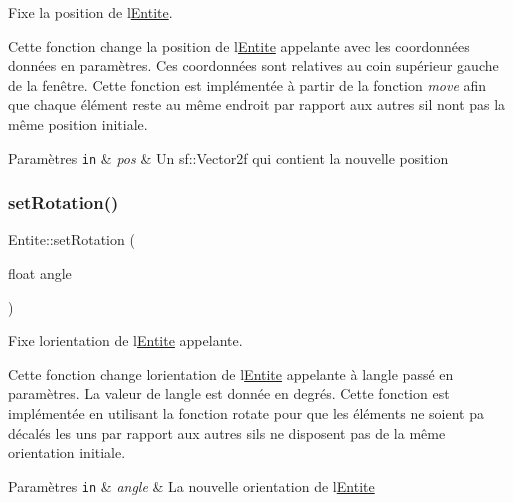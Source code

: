 Fixe la position de l\textquotesingle{}\hyperlink{class_entite}{Entite}. 

Cette fonction change la position de l\textquotesingle{}\hyperlink{class_entite}{Entite} appelante avec les coordonnées données en paramètres. Ces coordonnées sont relatives au coin supérieur gauche de la fenêtre. Cette fonction est implémentée à partir de la fonction {\itshape move} afin que chaque élément reste au même endroit par rapport aux autres s\textquotesingle{}il n\textquotesingle{}ont pas la même position initiale. 
\begin{DoxyParams}[1]{Paramètres}
\mbox{\tt in}  & {\em pos} & Un {\ttfamily sf\+::\+Vector2f} qui contient la nouvelle position \\
\hline
\end{DoxyParams}
\mbox{\label{class_entite_a8623ac815e34b553098f45696ea8918b}} 
\subsubsection{\texorpdfstring{set\+Rotation()}{setRotation()}}
{\footnotesize\ttfamily Entite\+::set\+Rotation (\begin{DoxyParamCaption}\item[{float}]{angle }\end{DoxyParamCaption})}



Fixe l\textquotesingle{}orientation de l\textquotesingle{}\hyperlink{class_entite}{Entite} appelante. 

Cette fonction change l\textquotesingle{}orientation de l\textquotesingle{}\hyperlink{class_entite}{Entite} appelante à l\textquotesingle{}angle passé en paramètres. La valeur de l\textquotesingle{}angle est donnée en degrés. Cette fonction est implémentée en utilisant la fonction rotate pour que les éléments ne soient pa décalés les uns par rapport aux autres s\textquotesingle{}ils ne disposent pas de la même orientation initiale. 
\begin{DoxyParams}[1]{Paramètres}
\mbox{\tt in}  & {\em angle} & La nouvelle orientation de l\textquotesingle{}\hyperlink{class_entite}{Entite} \\
\hline
\end{DoxyParams}
\mbox{\label{class_entite_a665939253829baba965ce3ead0f1739c}} 
